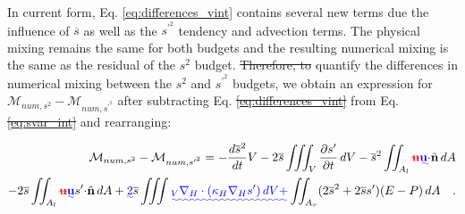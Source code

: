 \documentclass[draft]{agujournal2019}
\providecommand{\DIFadd}[1]{{\protect\color{blue}\uwave{#1}}} %
\providecommand{\DIFdel}[1]{{\protect\color{red}\sout{#1}}}                      %
\providecommand{\DIFaddbegin}{} %
\providecommand{\DIFaddend}{} %
\providecommand{\DIFdelbegin}{} %
\providecommand{\DIFdelend}{} %
\begin{document}
In current form, Eq. \ref{eq:differences_vint} contains several new terms due \DIFaddbegin \DIFadd{to }\DIFaddend the influence of $\overline{s}$ as well as the $s^{\prime^2}$ tendency and advection terms. The physical mixing remains the same for both budgets and the resulting numerical mixing is the same as the residual of the $s^2$ budget. \DIFdelbegin \DIFdel{Therefore, to }\DIFdelend \DIFaddbegin \DIFadd{To }\DIFaddend quantify the differences in numerical mixing between the $s^2$ and $s^{\prime^2}$ budgets, we obtain an expression for $\mathcal{M}_{num, s^2}-\mathcal{M}_{num, s^{\prime^2}}$ after subtracting Eq. \DIFdelbegin \DIFdel{\ref{eq:differences_vint} }\DIFdelend \DIFaddbegin \DIFadd{\ref{eq:svar_int} }\DIFaddend from Eq. \DIFdelbegin \DIFdel{\ref{eq:svar_int} }\DIFdelend \DIFaddbegin \DIFadd{\ref{eq:differences_vint} }\DIFaddend and rearranging:
\begin{linenomath*}
\begin{equation} \DIFdelbegin %
\DIFdelend \DIFaddbegin \label{eq:differences}
    \DIFaddend \begin{split}
    \mathcal{M}_{num, s^2} - \mathcal{M}_{num, s^{\prime^2}}=-\frac{d \overline{s}^2}{d t} V   - 2\overline{s} \iiint_V \frac{\partial s^\prime}{\partial t} \, dV- \overline{s}^2 \iint_{A_l} \DIFdelbegin \textbf{\DIFdel{u}} %
\DIFdelend \DIFaddbegin \DIFadd{\mathbf{u} \cdot }\hat{\mathbf{n}} \DIFaddend \, dA  \\ -2 \overline{s} \iint_{A_l} \DIFdelbegin \textbf{\DIFdel{u}}%
\DIFdelend \DIFaddbegin \DIFadd{\mathbf{u}}\DIFaddend s^{\prime} \DIFaddbegin \DIFadd{\cdot }\hat{\mathbf{n}} \DIFaddend \, dA  + \DIFaddbegin \DIFadd{2 }\overline{s} \iiint\DIFadd{_{V} \nabla_H \cdot (\kappa_H \nabla_H s^{\prime}) \, dV + }\DIFaddend \iint_{A_v} (2\overline{s}^2+2 \overline{s} s^\prime)(E-P) \, dA \quad .
    \end{split}
\end{equation}
\end{linenomath*}
\end{document}
